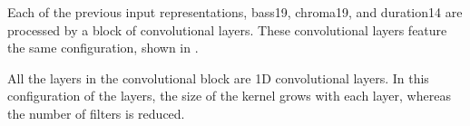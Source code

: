 

Each of the previous input representations, \gls{bass19},
\gls{chroma19}, and \gls{duration14} are processed by a
block of convolutional layers. These convolutional layers
feature the same configuration, shown in
.


All the layers in the convolutional block are 1D
convolutional layers. In this configuration of the layers,
the size of the kernel grows with each layer, whereas the
number of filters is reduced.

